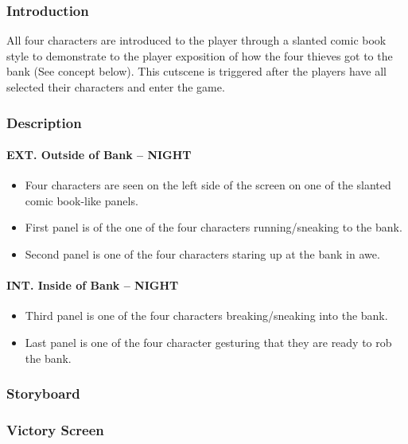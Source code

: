 \documentclass[10pt]{report}
\begin{document}
\subsubsection{Introduction}

All four characters are introduced to the player through a slanted comic book style to demonstrate to the player exposition of how the four thieves got to the bank (See concept below). This cutscene is triggered after the players have all selected their characters and enter the game.

\subsubsection{Description}

\paragraph{EXT. Outside of Bank -- NIGHT} \mbox \\
\begin{itemize}
    \item Four characters are seen on the left side of the screen on one of the slanted comic book-like panels. 
    \item First panel is of the one of the four characters running/sneaking to the bank.
    \item Second panel is one of the four characters staring up at the bank in awe.
\end{itemize}
\paragraph{INT. Inside of Bank -- NIGHT} \mbox \\
\begin{itemize}
    \item Third panel is one of the four characters breaking/sneaking into the bank.
    \item Last panel is one of the four character gesturing that they are ready to rob the bank.
\end{itemize}

\subsubsection{Storyboard}

\subsubsection{Victory Screen}
\end{document}
